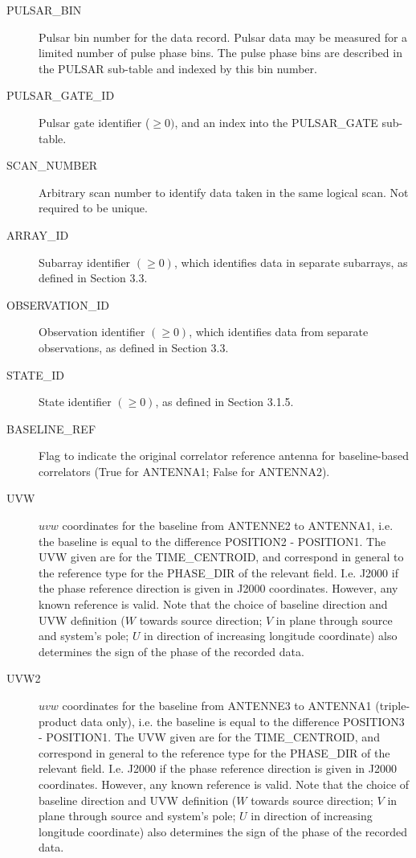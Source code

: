 \documentclass{article}
\begin{document}
\begin{description}
\item[PULSAR\_BIN] Pulsar bin number for the data record. Pulsar data
may be measured for a limited number of pulse phase bins. The pulse
phase bins are described in the PULSAR sub-table and indexed by this
bin number.

\item[PULSAR\_GATE\_ID] Pulsar gate identifier ($\geq 0)$, and an
index into the PULSAR\_GATE sub-table. 

\item[SCAN\_NUMBER] Arbitrary scan number to identify data taken in
the same logical scan. Not required to be unique.

\item[ARRAY\_ID] Subarray identifier $(\geq 0)$, which identifies data
in separate subarrays, as defined in Section 3.3.

\item[OBSERVATION\_ID] Observation identifier $(\geq 0)$, which identifies
data from separate observations, as defined in Section 3.3.

\item[STATE\_ID] State identifier $(\geq 0)$, as defined in Section 3.1.5.

\item[BASELINE\_REF] Flag to indicate the original correlator
reference antenna for baseline-based correlators (True for ANTENNA1;
False for ANTENNA2).

\item[UVW] $uvw$ coordinates for the baseline from ANTENNE2 to ANTENNA1,
   i.e. the
   baseline is equal to the difference POSITION2 - POSITION1. The UVW given
   are for the TIME\_CENTROID, and correspond in general to the reference type
   for the PHASE\_DIR of the relevant field. I.e. J2000 if the phase reference
   direction is given in J2000 coordinates. However, any known reference is
   valid.
   Note that the choice of baseline direction and UVW definition ($W$ towards
   source direction; $V$ in plane through source and system's pole; $U$ in
   direction of increasing longitude coordinate) also determines the sign of
   the phase of the recorded data.

\item[UVW2] $uvw$ coordinates for the baseline from ANTENNE3 to ANTENNA1
   (triple-product data only), i.e. the
   baseline is equal to the difference POSITION3 - POSITION1. The UVW given
   are for the TIME\_CENTROID, and correspond in general to the reference type
   for the PHASE\_DIR of the relevant field. I.e. J2000 if the phase reference
   direction is given in J2000 coordinates. However, any known reference is
   valid.
   Note that the choice of baseline direction and UVW definition ($W$ towards
   source direction; $V$ in plane through source and system's pole; $U$ in
   direction of increasing longitude coordinate) also determines the sign of
   the phase of the recorded data.


\end{description}
\end{document}
